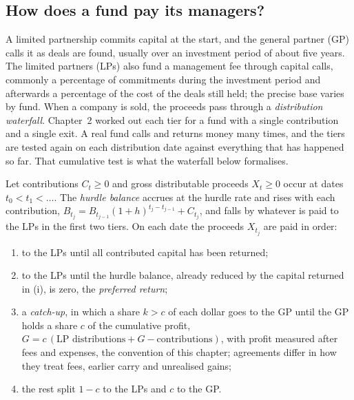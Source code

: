 \begin{chapterrefs}
\FloatBarrier
\section{How does a fund pay its managers?}
\label{sec11:fees}

A limited partnership commits capital at the start, and the general partner (GP) calls it as deals
are found, usually over an investment period of about five years. The limited partners (LPs) also fund a
management fee through capital calls, commonly a percentage of commitments during the investment
period and afterwards a percentage of the cost of the deals still held; the precise base varies by
fund. When a company
is sold, the proceeds pass through a \emph{distribution waterfall}. Chapter~2 worked out each tier
for a fund with a single contribution and a single exit. A real fund calls and returns money many
times, and the tiers are tested again on each distribution date against everything that has happened
so far. That cumulative test is what the waterfall below formalises.

\begin{definition}\label{def11:waterfall}
Let contributions $C_t\ge0$ and gross distributable proceeds $X_t\ge0$ occur at dates $t_0<t_1<\dots$.
The \emph{hurdle balance} accrues at the hurdle rate and rises with each contribution,
$B_{t_j}=B_{t_{j-1}}(1+h)^{t_j-t_{j-1}}+C_{t_j}$, and falls by whatever is paid to the LPs in the first two
tiers. On each date the proceeds $X_{t_j}$ are paid in order:
\begin{enumerate}[label=(\roman*)]
  \item to the LPs until all contributed capital has been returned;
  \item to the LPs until the hurdle balance, already reduced by the capital returned in (i), is zero,
        the \emph{preferred return};
  \item a \emph{catch-up}, in which a share $k>c$ of each dollar goes to the GP until the GP holds a share
        $c$ of the cumulative profit, $G=c\,(\text{LP distributions}+G-\text{contributions})$, with
        profit measured after fees and expenses, the convention of this chapter; agreements differ in
        how they treat fees, earlier carry and unrealised gains;
  \item the rest split $1-c$ to the LPs and $c$ to the GP.
\end{enumerate}
\end{definition}


\end{chapterrefs}
